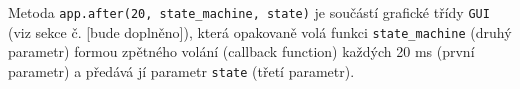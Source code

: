 




Metoda \texttt{app.after(20, state\_machine, state)} je součástí grafické třídy \texttt{GUI} (viz sekce č. [bude doplněno]), která opakovaně volá funkci \texttt{state\_machine} (druhý parametr) formou zpětného volání (callback function) každých 20 ms (první parametr) a předává jí parametr \texttt{state} (třetí parametr).


